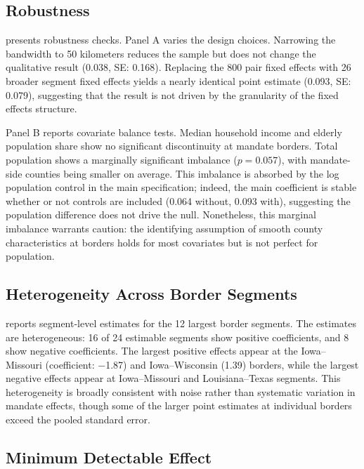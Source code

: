 \documentclass[12pt]{article}
\begin{document}
\subsection{Robustness}



 presents robustness checks. Panel A varies the design choices. Narrowing the bandwidth to 50 kilometers reduces the sample but does not change the qualitative result (0.038, SE: 0.168). Replacing the 800 pair fixed effects with 26 broader segment fixed effects yields a nearly identical point estimate (0.093, SE: 0.079), suggesting that the result is not driven by the granularity of the fixed effects structure.

Panel B reports covariate balance tests. Median household income and elderly population share show no significant discontinuity at mandate borders. Total population shows a marginally significant imbalance ($p = 0.057$), with mandate-side counties being smaller on average. This imbalance is absorbed by the log population control in the main specification; indeed, the main coefficient is stable whether or not controls are included (0.064 without, 0.093 with), suggesting the population difference does not drive the null. Nonetheless, this marginal imbalance warrants caution: the identifying assumption of smooth county characteristics at borders holds for most covariates but is not perfect for population.

\subsection{Heterogeneity Across Border Segments}



 reports segment-level estimates for the 12 largest border segments. The estimates are heterogeneous: 16 of 24 estimable segments show positive coefficients, and 8 show negative coefficients. The largest positive effects appear at the Iowa--Missouri (coefficient: $-$1.87) and Iowa--Wisconsin (1.39) borders, while the largest negative effects appear at Iowa--Missouri and Louisiana--Texas segments. This heterogeneity is broadly consistent with noise rather than systematic variation in mandate effects, though some of the larger point estimates at individual borders exceed the pooled standard error.

\subsection{Minimum Detectable Effect}
\end{document}
